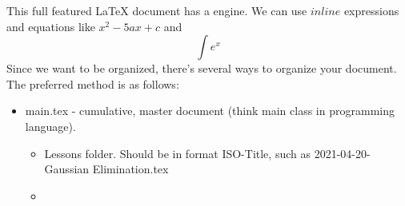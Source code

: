 \markdownRendererUlBegin
\markdownRendererUlItem This full featured LaTeX document has a  engine.\markdownRendererUlItemEnd 
\markdownRendererUlItem We can use $inline$ expressions and equations like $x^2-5ax+c$ and $$\int e^x$$\markdownRendererUlItemEnd 
\markdownRendererUlEnd \markdownRendererInterblockSeparator
{}\markdownRendererInterblockSeparator
{}Since we want to be organized, there's several ways to organize your document. The preferred method is as follows:\markdownRendererInterblockSeparator
{}\markdownRendererInterblockSeparator
{}\begin{itemize} \item main.tex - cumulative, master document (think main class in programming language). \begin{itemize} \item Lessons folder. Should be in format ISO-Title, such as 2021-04-20-Gaussian Elimination.tex \item \end{itemize} \end{itemize}\relax